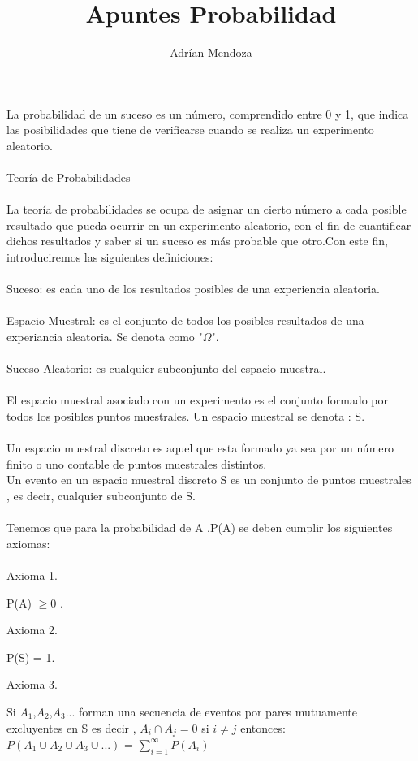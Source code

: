 \documentclass[]{article}
\title{Apuntes Probabilidad}
\author{Adr\'ian Mendoza}
\begin{document}
\maketitle

La probabilidad de un suceso es un n\'umero, comprendido entre 0 y 1, que indica las posibilidades que tiene de verificarse cuando se realiza un experimento aleatorio.\\\\
Teor\'ia de Probabilidades\\\\
La teor\'ia de probabilidades se ocupa de asignar un cierto n\'umero a cada posible resultado que pueda ocurrir en un experimento aleatorio, con el fin de cuantificar dichos resultados y saber si un suceso es m\'as probable que otro.Con este fin, introduciremos las siguientes definiciones:\\\\
Suceso: es cada uno de los resultados posibles de una experiencia aleatoria.\\\\
Espacio Muestral: es el conjunto de todos los posibles resultados de una experiancia aleatoria. Se denota como "$\Omega$".\\\\
Suceso Aleatorio: es cualquier subconjunto del espacio muestral.\\\\
El espacio muestral asociado con un experimento es el conjunto formado por todos los posibles puntos muestrales. Un espacio muestral se denota : S.\\\\
Un espacio muestral discreto es aquel que esta formado ya sea por un n\'umero finito o uno contable de puntos muestrales distintos.\\
Un evento en un espacio muestral discreto S es un conjunto de puntos muestrales , es decir, cualquier subconjunto de S.\\\\
\newpage
Tenemos que para la probabilidad de A ,P(A) se deben cumplir los siguientes axiomas:\\\\
Axioma 1.
\begin{center}
	 P(A) $\geq 0$ .
\end{center}
 Axioma 2.
\begin{center}
	 P(S) = 1.
\end{center}
 Axioma 3.
\begin{center}
	 Si $A_{1}$,$A_{2}$,$A_{3}$...  forman una secuencia de eventos por pares mutuamente excluyentes en S es decir , $A_{i}\cap A_{j} = 0$ si $i \neq j$ entonces:\\
 $P(A_{1}\cup A_{2}\cup A_{3}\cup...)$ = $\displaystyle
 \sum_{i=1}^{\infty}P(A_{i})$
\end{center}
\end{document}
